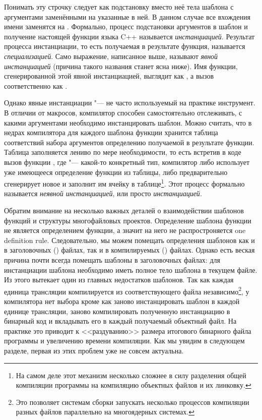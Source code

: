 Понимать эту строчку следует как подстановку вместо неё тела шаблона с аргументами заменёнными на указанные в ней.
В данном случае все вхождения имени  заменятся на .
Формально, процесс подстановки аргументов в шаблон и получение настоящей функции языка C++ называется \textit{инстанциацией}.
Результат процесса инстанциации, то есть получаемая в результате функция, называется \textit{специализацией}.
Само выражение, написанное выше, называют \textit{явной инстанциацией} (причина такого названия станет ясна ниже).
Имя функции, сгенерированной этой явной инстанциацией, выглядит как , а вызов соответственно как .

Однако явные инстанциации "--- не часто используемый на практике инструмент.
В отличии от макросов, компилятор способен самостоятельно отслеживать, с какими аргументами необходимо инстанцировать шаблон.
Можно считать, что в недрах компилятора для каждого шаблона функции хранится таблица соответствий набора аргументов определению получаемой в результате функции.
Таблица заполняется лениво по мере необходимости, то есть встретив в коде вызов функции , где  "--- какой-то конкретный тип, компилятор либо использует уже имеющееся определение функции из таблицы, либо предварительно сгенерирует новое и заполнит им ячейку в таблице\footnote{На самом деле этот механизм несколько сложнее в силу разделения общей компиляции программы на компиляцию объектных файлов и их линковку.}.
Этот процесс формально называется \textit{неявной инстанциацией}, или просто \textit{инстанциацией}.

Обратим внимание на несколько важных деталей о взаимодействии шаблонов функций и структуры многофайловых проектов.
Определение шаблона функции не является определением функции, а значит на него не распростроняется one definition rule.
Следовательно, мы можем помещать определения шаблонов как и в заголовочных () файлах, так и в компилируемых () файлах.
Однако есть веская причина почти всегда помещать шаблоны в заголовочных файлах: для инстанциации шаблона необходимо иметь полное тело шаблона в текущем файле.
Из этого вытекает один из главных недостатков шаблонов.
Так как каждая единица трансляции компилируется из соответствующего  файла независимо\footnote{Это позволяет системам сборки запускать несколько процессов компиляции разных файлов параллельно на многоядерных системах.}, у компилятора нет выбора кроме как заново инстанцировать шаблон в каждой единице трансляции, заново компилировать полученную инстанциацию в бинарный код и вкладывать его в каждый получаемый объектный файл.
На практике это приводит к <<раздуванию>> размера итогового бинарного файла программы и увеличению времени компиляции.
Как мы увидим в следующем разделе, первая из этих проблем уже не совсем актуальна.

